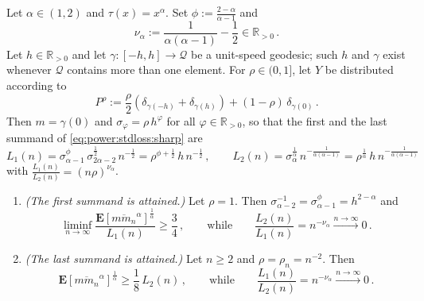 \documentclass{article}
\newcommand*{\mc}[1]{\mathcal{#1}}
\newcommand{\R}{\mathbb{R}}
\newcommand{\Rpp}{\R_{>0}}
\newcommand{\lab}{\left[} %
\newcommand{\rab}{\right]} %
\newcommand{\ab}[1]{\lab #1 \rab} %
\newcommand{\abOf}[1]{\!\ab{#1}} %
\newcommand{\lb}{\left(} %
\newcommand{\rb}{\right)} %
\newcommand{\br}[1]{\lb #1 \rb} %
\newcommand{\brOf}[1]{\!\br{#1}} %
\newcommand{\E}{\mathbf{E}} %
\newcommand{\EOf}[1]{\E\abOf{#1}}
\newcommand{\eqcm}{\,,} %
\newcommand{\eqfs}{\,.}
\newcommand{\ol}[2]{\overline{#1#2}}
\newcommand{\tran}{\tau}
\begin{document}
%
\begin{proposition}\label{prop:optimality}
    Let $\alpha \in (1,2)$ and $\tran(x)=x^\alpha$. Set $\phi := \frac{2-\alpha}{\alpha-1}$ and
    \begin{equation}
        \nu_\alpha := \frac1{\alpha(\alpha-1)}-\frac12 \in\Rpp
        \eqfs
    \end{equation}
    Let $h\in\Rpp$ and let $\gamma\colon[-h,h]\to\mc Q$ be a unit-speed geodesic; such $h$ and $\gamma$ exist whenever $\mc Q$ contains more than one element.
    For $\rho\in(0,1]$, let $Y$ be distributed according to
    \begin{equation}
        P^\rho := \frac\rho2\brOf{\delta_{\gamma(-h)}+\delta_{\gamma(h)}}+(1-\rho)\,\delta_{\gamma(0)}
        \eqfs
    \end{equation}
    Then $m = \gamma(0)$ and $\sigma_\varphi = \rho\,h^\varphi$ for all $\varphi\in\Rpp$, so that the first and the last summand of \eqref{eq:power:stdloss:sharp} are
    \begin{equation}
        L_1(n) = \sigma_{\alpha-1}^{\phi}\, \sigma_{2\alpha-2}^{\frac12}\, n^{-\frac12} = \rho^{\phi+\frac12}\, h\, n^{-\frac12}
        \eqcm\qquad
        L_2(n) = \sigma_\alpha^{\frac1\alpha}\, n^{-\frac{1}{\alpha(\alpha-1)}} =  \rho^{\frac1\alpha}\, h\, n^{-\frac1{\alpha(\alpha-1)}}
    \end{equation}
    with $\frac{L_1(n)}{L_2(n)} = \br{n\rho}^{\nu_\alpha}$.
    \begin{enumerate}[label=(\roman*)]
        \item \label{prop:optimality:first}
        \emph{(The first summand is attained.)}
        Let $\rho=1$. Then $\sigma_{\alpha-2}^{-1} = \sigma_{\alpha-1}^{\phi} = h^{2-\alpha}$ and
        \begin{equation}
            \liminf_{n\to\infty} \frac{\EOf{\ol m{m_n}^\alpha}^{\frac1\alpha}}{L_1(n)}
            \geq
            \frac34
            \eqcm\qquad\text{while}\qquad
            \frac{L_2(n)}{L_1(n)} = n^{-\nu_\alpha} \xrightarrow{n\to\infty} 0
            \eqfs
        \end{equation}
        \item \label{prop:optimality:last}
        \emph{(The last summand is attained.)}
        Let $n\geq2$ and $\rho = \rho_n = n^{-2}$. Then
        \begin{equation}
            \EOf{\ol m{m_n}^\alpha}^{\frac1\alpha}
            \geq
            \frac18\, L_2(n)
            \eqcm\qquad\text{while}\qquad
            \frac{L_1(n)}{L_2(n)} = n^{-\nu_\alpha} \xrightarrow{n\to\infty} 0
            \eqfs
        \end{equation}
    \end{enumerate}
\end{proposition}
\end{document}
